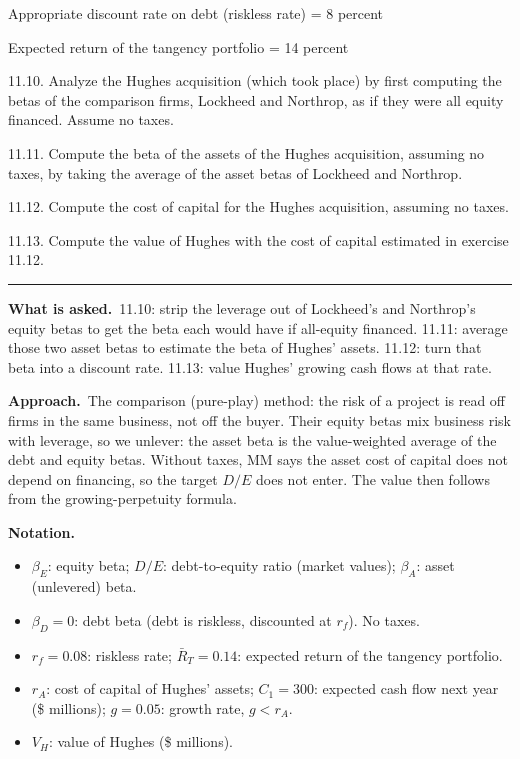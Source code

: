 \documentclass[11pt,a4paper]{article}
\numberwithin{equation}{section}
\newenvironment{notation}{\par\noindent\textbf{Notation.}\begin{itemize}[leftmargin=1.4em]}{\end{itemize}}
\newcommand{\asked}{\par\medskip\noindent\textbf{What is asked.}~}
\newcommand{\approach}{\par\smallskip\noindent\textbf{Approach.}~}
\newcommand{\stmtend}{\par\endgroup\nopagebreak\noindent\rule{\linewidth}{0.4pt}\par\medskip}
\begin{document}
Appropriate discount rate on debt (riskless rate) = 8 percent

Expected return of the tangency portfolio = 14 percent

11.10. Analyze the Hughes acquisition (which took place) by first computing the betas of the
comparison firms, Lockheed and Northrop, as if they were all equity financed. Assume no taxes.

11.11. Compute the beta of the assets of the Hughes acquisition, assuming no taxes, by taking the
average of the asset betas of Lockheed and Northrop.

11.12. Compute the cost of capital for the Hughes acquisition, assuming no taxes.

11.13. Compute the value of Hughes with the cost of capital estimated in exercise 11.12.
\stmtend

\asked 11.10: strip the leverage out of Lockheed's and Northrop's equity betas to get the beta
each would have if all-equity financed. 11.11: average those two asset betas to estimate the
beta of Hughes' assets. 11.12: turn that beta into a discount rate. 11.13: value Hughes' growing
cash flows at that rate.

\approach The comparison (pure-play) method: the risk of a project is read off firms in the same
business, not off the buyer. Their equity betas mix business risk with leverage, so we unlever:
the asset beta is the value-weighted average of the debt and equity betas. Without taxes, MM
says the asset cost of capital does not depend on financing, so the target $D/E$ does not enter.
The value then follows from the growing-perpetuity formula.

\begin{notation}
  \item $\beta_E$: equity beta; $D/E$: debt-to-equity ratio (market values); $\beta_A$: asset (unlevered) beta.
  \item $\beta_D=0$: debt beta (debt is riskless, discounted at $r_f$). No taxes.
  \item $r_f=0.08$: riskless rate; $\bar R_T=0.14$: expected return of the tangency portfolio.
  \item $r_A$: cost of capital of Hughes' assets; $C_1=300$: expected cash flow next year (\$ millions); $g=0.05$: growth rate, $g<r_A$.
  \item $V_H$: value of Hughes (\$ millions).
\end{notation}
\end{document}
